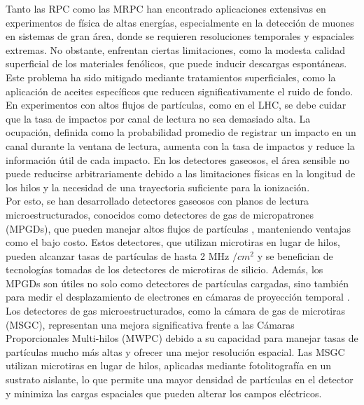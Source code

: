 \documentclass{report}
\begin{document}
\noindent Tanto las RPC como las MRPC han encontrado aplicaciones extensivas en experimentos de física de altas energías, especialmente en la detección de muones en sistemas de gran área, donde se requieren resoluciones temporales y espaciales extremas. No obstante, enfrentan ciertas limitaciones, como la modesta calidad superficial de los materiales fenólicos, que puede inducir descargas espontáneas. Este problema ha sido mitigado mediante tratamientos superficiales, como la aplicación de aceites específicos que reducen significativamente el ruido de fondo. \\

\noindent En experimentos con altos flujos de partículas, como en el LHC, se debe cuidar que la tasa de impactos por canal de lectura no sea demasiado alta. La ocupación, definida como la probabilidad promedio de registrar un impacto en un canal durante la ventana de lectura, aumenta con la tasa de impactos y reduce la información útil de cada impacto. En los detectores gaseosos, el área sensible no puede reducirse arbitrariamente debido a las limitaciones físicas en la longitud de los hilos y la necesidad de una trayectoria suficiente para la ionización.\\

\noindent Por esto, se han desarrollado detectores gaseosos con planos de lectura microestructurados, conocidos como detectores de gas de micropatrones (MPGDs), que pueden manejar altos flujos de partículas \cite{oed1988position}, manteniendo ventajas como el bajo costo. Estos detectores, que utilizan microtiras en lugar de hilos, pueden alcanzar tasas de partículas de hasta 2 MHz $/cm^{2}$ y se benefician de tecnologías tomadas de los detectores de microtiras de silicio. Además, los MPGDs son útiles no solo como detectores de partículas cargadas, sino también para medir el desplazamiento de electrones en cámaras de proyección temporal \cite{giomataris1996micromegas}.\\

\noindent Los detectores de gas microestructurados, como la cámara de gas de microtiras (MSGC), representan una mejora significativa frente a las Cámaras Proporcionales Multi-hilos (MWPC) debido a su capacidad para manejar tasas de partículas mucho más altas y ofrecer una mejor resolución espacial. Las MSGC utilizan microtiras en lugar de hilos, aplicadas mediante fotolitografía en un sustrato aislante, lo que permite una mayor densidad de partículas en el detector y minimiza las cargas espaciales que pueden alterar los campos eléctricos.\\
\end{document}
